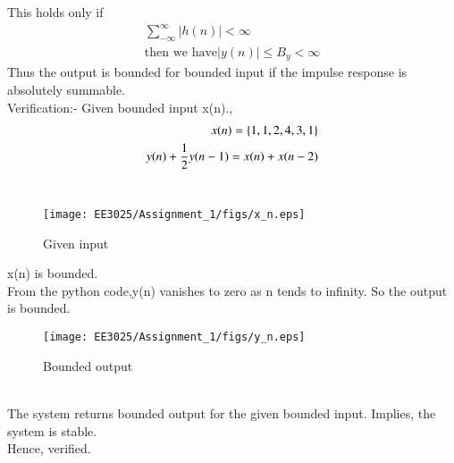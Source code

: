 \documentclass[journal,12pt,twocolumn]{IEEEtran}
\begin{document}
 This holds only if
 \begin{align}
 \sum_{-\infty}^{\infty}|{h(n)}| < 
\infty \\
\text{then we have} |{y(n)}| \leq B_y < \infty 
\end{align}
Thus the output is bounded for bounded input if the impulse response is absolutely summable.\\
Verification:- Given bounded input x(n).,
\begin{align}
x(n) = \left\{1,1,2,4,3,1\right\}\\
y(n)+\frac{1}{2}y(n-1) = x(n)+x(n-2)
\end{align} \\
\begin{figure}[h!]
    \centering
    \texttt{[image: EE3025/Assignment\_1/figs/x\_n.eps]}
    \caption{Given input}
    \label{xn}
\end{figure}
x(n) is bounded.\\
From the python code,y(n) vanishes to zero as n tends to infinity. So the output is bounded.\\
\begin{figure}[h!]
    \centering
    \texttt{[image: EE3025/Assignment\_1/figs/y\_n.eps]}
    \caption{Bounded output}
    \label{yn}
\end{figure} \\
The system returns bounded output for the given bounded input. Implies, the system is stable.\\ Hence, verified.
\end{document}
